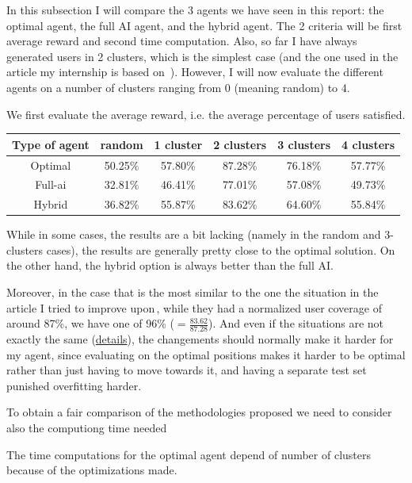 \documentclass[letterpaper]{article}
\begin{document}
In this subsection I will compare the 3 agents we have seen in this report: the optimal agent, the full AI agent, and the hybrid agent.
The 2 criteria will be first average reward and second time computation.
Also, so far I have always generated users in 2 clusters, which is the simplest case (and the one used in the article my internship is based on \,\cite{main_article}).
However, I will now evaluate the different agents on a number of clusters ranging from 0 (meaning random) to 4.

We first evaluate the average reward, i.e. the average percentage of users satisfied.

\begin{center}
    \begin{tabular}{|c|c|c|c|c|c|}
    \hline 
     Type of agent & random & 1 cluster & 2 clusters & 3 clusters & 4 clusters \\ 
     \hline
     Optimal & 50.25\% & 57.80\% & 87.28\% & 76.18\% & 57.77\% \\  
     \hline
     Full-ai & 32.81\% & 46.41\% & 77.01\% & 57.08\% & 49.73\%  \\
     \hline
     Hybrid &  36.82\% & 55.87\% & 83.62\% & 64.60\% & 55.84\%  \\
     \hline
    \end{tabular}
\end{center}

While in some cases, the results are a bit lacking (namely in the random and 3-clusters cases), the results are generally pretty close to the optimal solution.
On the other hand, the hybrid option is always better than the full AI.

Moreover, in the case that is the most similar to the one the situation in the article I tried to improve upon\,\cite{main_article}, while they had a normalized user coverage
of around 87\%, we have one of 96\% ($=\frac{83.62}{87.28}$). And even if the situations are not exactly the same (\hyperref[reinforcement]{details}), the changements should normally make it harder for my agent,
since evaluating on the optimal positions makes it harder to be optimal rather than just having to move towards it,
and having a separate test set punished overfitting harder.

To obtain a fair comparison of the methodologies proposed we need to consider also the computiong time needed

The time computations for the optimal agent depend of number of clusters because of the optimizations made.
\end{document}
